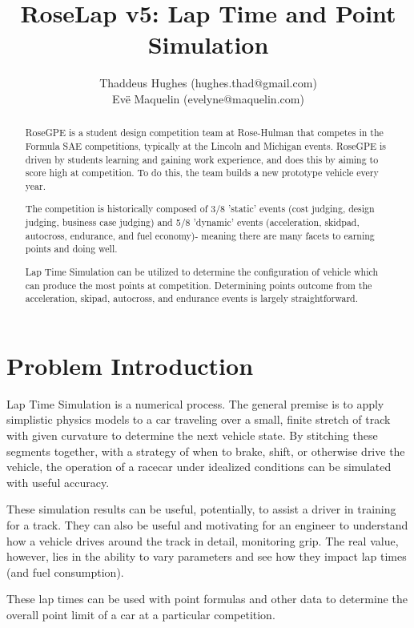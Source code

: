 \documentclass{article}
\begin{document}
\title{RoseLap v5: Lap Time and Point Simulation}
\author{Thaddeus Hughes (hughes.thad@gmail.com) \\ Evë Maquelin (evelyne@maquelin.com)}

\maketitle

\begin{abstract}
RoseGPE is a student design competition team at Rose-Hulman that competes in the Formula SAE competitions, typically at the Lincoln and Michigan events. RoseGPE is driven by students learning and gaining work experience, and does this by aiming to score high at competition. To do this, the team builds a new prototype vehicle every year.

The competition is historically composed of 3/8 'static' events (cost judging, design judging, business case judging) and 5/8 'dynamic' events (acceleration, skidpad, autocross, endurance, and fuel economy)- meaning there are many facets to earning points and doing well.

Lap Time Simulation can be utilized to determine the configuration of vehicle which can produce the most points at competition. Determining points outcome from the acceleration, skipad, autocross, and endurance events is largely straightforward.
\end{abstract}

\section{Problem Introduction}
Lap Time Simulation is a numerical process. The general premise is to apply simplistic physics models to a car traveling over a small, finite stretch of track with given curvature to determine the next vehicle state. By stitching these segments together, with a strategy of when to brake, shift, or otherwise drive the vehicle, the operation of a racecar under idealized conditions can be simulated with useful accuracy.

These simulation results can be useful, potentially, to assist a driver in training for a track. They can also be useful and motivating for an engineer to understand how a vehicle drives around the track in detail, monitoring grip. The real value, however, lies in the ability to vary parameters and see how they impact lap times (and fuel consumption).

These lap times can be used with point formulas and other data to determine the overall point limit of a car at a particular competition.
\end{document}
